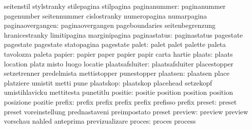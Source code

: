                            seitenstil                stylstranky
                           stilepagina               stilpagina
             paginanummer: paginanummer              pagenumber
                           seitennummer              cislostranky
                           numeropagina              numarpagina
         paginaovergangen: paginaovergangen          pageboundaries
                           seitenbegrenzung          hranicestranky
                           limitipagina              marginipagina
             paginastatus: paginastatus              pagestate
                           pagestate                 pagestate
                           statopagina               pagestate %
                    palet: palet                     palet
                           palette                   paleta
                           tavolozza                 paleta
                   papier: papier                    paper
                           papier                    papir
                           carta                     hartie
                   plaats: plaats                    location
                           platz                     misto
                           luogo                     locatie
          plaatsafsluiter: plaatsafsluiter           placestopper
                           setzetrenner              predelmista
                           mettistopper              punestopper %
                 plaatsen: plaatsen                  place
                           platziere                 umistit
                           metti                     pune %
                plaatskop: plaatskop                 placehead
                           setzekopf                 umistihlavicku
                           mettitesta                punetitlu %
                  positie: positie                   position
                           position                  position
                           posizione                 pozitie %
                   prefix: prefix                    prefix
                           prefix                    prefix
                           prefisso                  prefix
                   preset: preset                    preset
                           voreinstellung            prednastaveni
                           preimpostato              preset %
                  preview: preview                   preview
                           vorschau                  nahled
                           anteprima                 previzualizare
proces: proces   process
